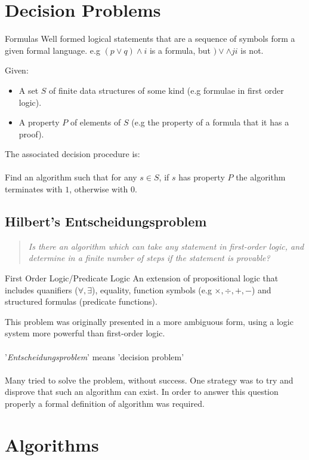 \section{Decision Problems}
\begin{definitionbox}{Formulas}
    Well formed logical statements that are a sequence of symbols form a given formal language. e.g $(p \lor q) \land i$ is a formula, but $) \lor \land j i$ is not.
\end{definitionbox}
Given:
\begin{itemize}
	\item A set $S$ of finite data structures of some kind (e.g formulae in first order logic).
	\item A property $P$ of elements of $S$ (e.g the property of a formula that it has a proof).
\end{itemize}
The associated decision procedure is:
\\
\\ Find an algorithm such that for any $s \in S$, if $s$ has property $P$ the algorithm terminates with $1$, otherwise with $0$.

\subsection{Hilbert's Entscheidungsproblem}
\begin{quote}
    \textit{Is there an algorithm which can take any statement in first-order logic, and determine in a finite number of steps if the statement is provable?}
\end{quote}
\begin{definitionbox}{First Order Logic/Predicate Logic}
    An extension of propositional logic that includes quanifiers ($\forall, \exists$), equality, function symbols (e.g $\times, \div, +, -$) and structured formulas (predicate functions).
\end{definitionbox}

\noindent This problem was originally presented in a more ambiguous form, using a logic system more powerful than first-order logic.
\\
\\ '\textit{Entscheidungsproblem}' means 'decision problem'
\\
\\ Many tried to solve the problem, without success. One strategy was to try and disprove that such an algorithm can exist.
In order to answer this question properly a formal definition of algorithm was required.
\section{Algorithms}
